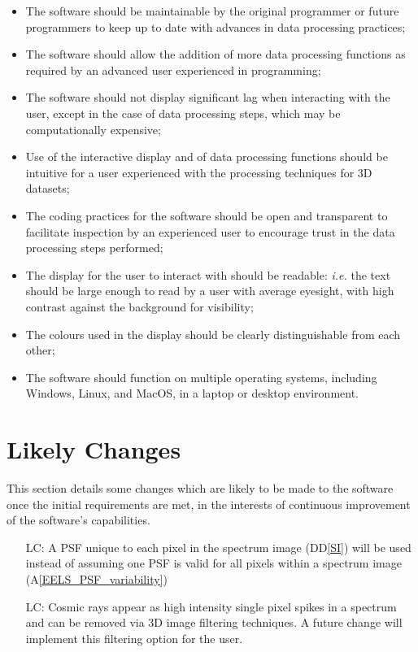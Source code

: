 \documentclass[12pt]{article}
\newcommand{\ddref}[1]{DD\ref{#1}}
\newcommand{\aref}[1]{A\ref{#1}}
\newcounter{lcnum} %
\begin{document}
\begin{itemize}
	\item The software should be maintainable by the original programmer or future
programmers to keep up to date with advances in data processing practices;
	\item The software should allow the addition of more data processing functions
as required by an advanced user experienced in programming;
	\item The software should not display significant lag when interacting with the
user, except in the case of data processing steps, which may be computationally
expensive;
	\item Use of the interactive display and of data processing functions should be
intuitive for a user experienced with the processing techniques for 3D datasets;
	\item The coding practices for the software should be open and transparent to
facilitate inspection by an experienced user to encourage trust in the data
processing steps performed;
	\item The display for the user to interact with should be readable:
\textit{i.e.} the text should be large enough to read by a user with average
eyesight, with high contrast against the background for visibility;
	\item The colours used in the display should be clearly distinguishable from
each other;
	\item The software should function on multiple operating systems, including
Windows, Linux, and MacOS, in a laptop or desktop environment.
\end{itemize}

\section{Likely Changes}
	This section details some changes which are likely to be made to the software
once the initial requirements are met, in the interests of continuous
improvement of the software's capabilities.
	\noindent \begin{itemize}
		\item[LC\refstepcounter{lcnum}\thelcnum\label{LC_identicalPSF}:] A PSF unique
to each pixel in the spectrum image (\ddref{SI}) will be used instead of
assuming one PSF is valid for all pixels within a spectrum image
(\aref{EELS_PSF_variability})
		\item[LC\refstepcounter{lcnum}\thelcnum\label{LC_identicalPSF}:] Cosmic rays
appear as high intensity single pixel spikes in a spectrum and can be removed
via 3D image filtering techniques. A future change will implement this filtering
option for the user. 
	\end{itemize}
\end{document}
